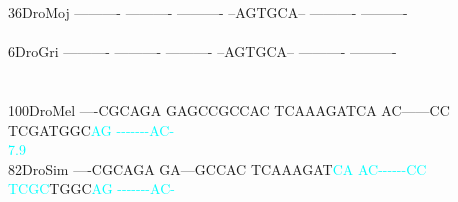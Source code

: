 \documentclass[11pt,twoside,reqno,a4paper]{article}
\begin{document}
{36\hspace*{2\charwidth}DroMoj	----------	----------	----------	--AGTGCA--	----------	----------	\\
\hspace*{4\charwidth}\hspace*{7\charwidth}\hspace*{1\charwidth}\hspace*{1\charwidth}\hspace*{1\charwidth}\hspace*{1\charwidth}\hspace*{1\charwidth}\hspace*{1\charwidth}\\
6\hspace*{3\charwidth}DroGri	----------	----------	----------	--AGTGCA--	----------	----------	\\
\hspace*{4\charwidth}\hspace*{7\charwidth}\hspace*{1\charwidth}\hspace*{1\charwidth}\hspace*{1\charwidth}\hspace*{1\charwidth}\hspace*{1\charwidth}\hspace*{1\charwidth}\\
\\
100\hspace*{1\charwidth}DroMel	----CGCAGA	GAGCCGCCAC	TCAAAGATCA	AC------CC	TCGATGGC\textcolor{cyan}{A}\textcolor{cyan}{G}	\textcolor{cyan}{-}\textcolor{cyan}{-}\textcolor{cyan}{-}\textcolor{cyan}{-}\textcolor{cyan}{-}\textcolor{cyan}{-}\textcolor{cyan}{-}\textcolor{cyan}{A}\textcolor{cyan}{C}\textcolor{cyan}{-}	\\
\hspace*{4\charwidth}\hspace*{7\charwidth}\hspace*{1\charwidth}\hspace*{1\charwidth}\hspace*{1\charwidth}\hspace*{1\charwidth}\hspace*{48\charwidth}\textcolor{cyan}{7.9}\hspace*{1\charwidth}\hspace*{1\charwidth}\\
82\hspace*{2\charwidth}DroSim	----CGCAGA	GA---GCCAC	TCAAAGAT\textcolor{cyan}{C}\textcolor{cyan}{A}	\textcolor{cyan}{A}\textcolor{cyan}{C}\textcolor{cyan}{-}\textcolor{cyan}{-}\textcolor{cyan}{-}\textcolor{cyan}{-}\textcolor{cyan}{-}\textcolor{cyan}{-}\textcolor{cyan}{C}\textcolor{cyan}{C}	\textcolor{cyan}{T}\textcolor{cyan}{C}\textcolor{cyan}{G}\textcolor{cyan}{C}TGGC\textcolor{cyan}{A}\textcolor{cyan}{G}	\textcolor{cyan}{-}\textcolor{cyan}{-}\textcolor{cyan}{-}\textcolor{cyan}{-}\textcolor{cyan}{-}\textcolor{cyan}{-}\textcolor{cyan}{-}\textcolor{cyan}{A}\textcolor{cyan}{C}\textcolor{cyan}{-}	\\
}
\end{document}
